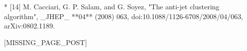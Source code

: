 * [14] M. Cacciari, G. P. Salam, and G. Soyez, "The anti-jet clustering algorithm", _JHEP_ **04** (2008) 063, doi:10.1088/1126-6708/2008/04/063, arXiv:0802.1189.

[MISSING_PAGE_POST]

 
